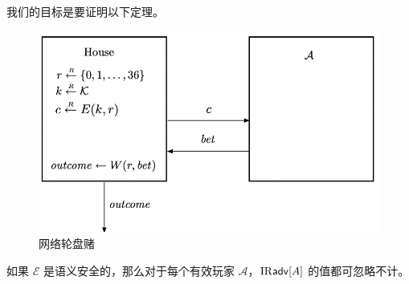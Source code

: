 我们的目标是要证明以下定理。

\begin{figure}
  \centering
  \includegraphics[width=0.6\linewidth]{figures/chapter2/fig2.png}
  \caption{网络轮盘赌}
  \label{fig:2-2}
\end{figure}

\begin{theorem}
如果 $\mathcal{E}$ 是语义安全的，那么对于每个有效玩家 $\mathcal{A}$，${\rm IR\mathsf{adv}}[A]$ 的值都可忽略不计。
\end{theorem}

